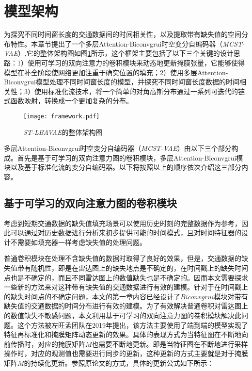 \section{模型架构} \label{sec4_3}
为探究不同时间窗长度的交通数据间的时间相关性，以及提取带有缺失值的空间分布特性。本章节提出了一个多层Attention-Biconvgrui时空变分自编码器（\textit{MCST-VAE}）,它的整体架构图如图\ref{framework}所示，这个框架主要包括了以下三个关键的设计思路：1）使用可学习的双向注意力的卷积模块来动态地更新掩膜张量，它能够使得模型在补全阶段使网络更加注重于确实位置的填充；2）使用多层Attention-Biconvgrui模型处理不同时间窗长度的模型，并探究不同时间窗长度数据的时间相关性；3）使用标准化流技术，将一个简单的对角高斯分布通过一系列可迭代的链式函数映射，转换成一个更加复杂的分布。

\begin{figure}[htbp]
\centering
\texttt{[image: framework.pdf]}
\caption{\textit{ST-LBAVAE}的整体架构图 \label{framework}}
\end{figure}

多层Attention-Biconvgrui时空变分自编码器（\textit{MCST-VAE}）由以下三个部分构成。首先是基于可学习的双向注意力图的卷积模块，多层Attention-Biconvgrui模块以及基于标准化流的变分自编码器。以下将按照以上的顺序依次介绍这三部分内容。

\subsection{基于可学习的双向注意力图的卷积模块}
考虑到短期交通数据的缺失值填充场景可以使用历史时刻的完整数据作为参考，因此可以通过对历史数据进行分析来初步提供可能的时间模式，且对时间特征器的设计不需要如填充器一样考虑缺失值的处理问题。

普通卷积模块在处理不含缺失值的数据时取得了良好的效果，但是，交通数据的缺失值带有随机性，即是在雷达图上的缺失地点是不确定的，在时间戳上的缺失时间点也是不确定的，而且不同雷达图上的数值缺失也是不确定的。因而本文需要探求一些新的方法来对这种带有缺失值的交通数据进行有效的建模。针对于在时间戳上的缺失时间点的不确定问题，本文的第一章内容已经设计了$Biconvgrui$模块对带有缺失值的交通数据的时间分布进行有效的建模。为了有效解决普通卷积对雷达图上的数值缺失不敏感问题，本文利用基于可学习的双向注意力图的卷积模块解决此问题。这个方法被左旺孟团队在2019年提出，该方法主要使用了端到端的模型实现了特征再标准化和掩膜矩阵动态更新的效果。具体的表现方式为当特征图在不断地向前传播时，对应的掩膜矩阵$M$也需要不断地更新。即是当特征图在不断地进行采样操作时，对应的观测值也需要进行同步的更新，这种更新的方式主要就是对于掩膜矩阵$M$的持续化更新。参照原论文的方式，具体的更新公式如下所示：


